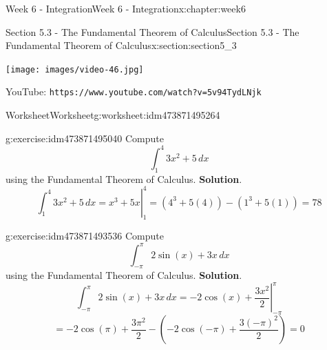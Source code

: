 \documentclass[oneside,10pt,]{book}
\newcommand{\blocktitlefont}{\relax}
\newcommand{\mono}[1]{\texttt{#1}}
\numberwithin{equation}{section}
\newlength{\qrsize}
\newlength{\previewwidth}
\begin{document}
\begin{chapterptx}{Week 6 - Integration}{}{Week 6 - Integration}{}{}{x:chapter:week6}
\begin{sectionptx}{Section 5.3 - The Fundamental Theorem of Calculus}{}{Section 5.3 - The Fundamental Theorem of Calculus}{}{}{x:section:section5_3}
\addtolength{\previewwidth}{-\qrsize}
\begin{tcbraster}[raster columns=2, raster column skip=1pt, raster halign=center, raster force size=false, raster left skip=0pt, raster right skip=0pt]%
\begin{tcolorbox}[previewstyle, width=\previewwidth]%
\texttt{[image: images/video-46.jpg]}%
\end{tcolorbox}%
\begin{tcolorbox}[qrstyle]%
{\hypersetup{urlcolor=black}}%
\end{tcolorbox}%
\begin{tcolorbox}[captionstyle]%
\small YouTube: \mono{https://www.youtube.com/watch?v=5v94TydLNjk}\end{tcolorbox}%
\end{tcbraster}%
%
%
\typeout{************************************************}
\typeout{************************************************}
%
\begin{worksheet-subsection}{Worksheet}{}{Worksheet}{}{}{g:worksheet:idm473871495264}
\begin{divisionexercise}{1}{}{}{g:exercise:idm473871495040}%
Compute%
\begin{equation*}
\int_1^4 3x^2+5 \, dx 
\end{equation*}
using the Fundamental Theorem of Calculus.%
\textbf{\blocktitlefont Solution}.\hypertarget{g:solution:idm473871494912}{}\quad{}%
\begin{equation*}
\left. \int_1^4 3x^2+5 \, dx = x^3+5x \right\vert_1^4 = (4^3+5(4))-(1^3+5(1))=78
\end{equation*}
\end{divisionexercise}%
\begin{divisionexercise}{2}{}{}{g:exercise:idm473871493536}%
Compute%
\begin{equation*}
\int_{-\pi}^{\pi} 2\sin(x)+3x \, dx 
\end{equation*}
using the Fundamental Theorem of Calculus.%
\textbf{\blocktitlefont Solution}.\hypertarget{g:solution:idm473871493408}{}\quad{}%
\begin{equation*}
\left. \int_{-\pi}^{\pi} 2\sin(x)+3x \, dx = -2\cos(x)+\frac{3x^2}{2} \right\vert_{-\pi}^{\pi} 
\end{equation*}
%
\begin{equation*}
= -2\cos(\pi)+\frac{3\pi^2}{2}-(-2\cos(-\pi)+\frac{3(-\pi)^2}{2}) = 0 

\end{equation*}
\end{divisionexercise}
\end{worksheet-subsection}
\end{sectionptx}
\end{chapterptx}
\end{document}

